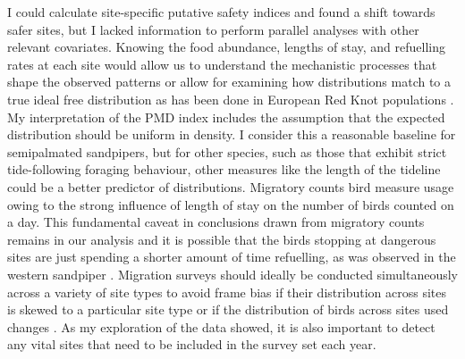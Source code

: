 I could calculate site-specific putative safety indices and found a shift towards safer sites, but I lacked information to perform parallel analyses with other relevant covariates. Knowing the food abundance, lengths of stay, and refuelling rates at each site would allow us to understand the mechanistic processes that shape the observed patterns or allow for examining how distributions match to a true ideal free distribution as has been done in European Red Knot populations \citep{Gils2006}. My interpretation of the PMD index  includes the assumption that the expected distribution should be uniform in density. I consider this a reasonable baseline for semipalmated sandpipers, but for other species, such as those that exhibit strict tide-following foraging behaviour, other measures like the length of the tideline could be a better predictor of distributions. Migratory counts  bird measure usage owing to the strong influence of length of stay on the number of birds counted on a day. This fundamental caveat in conclusions drawn from migratory counts remains in our analysis and it is possible that the birds stopping at dangerous sites are just spending a shorter amount of time refuelling, as was observed in the western sandpiper \citep{ydenberg_western_2004}. Migration surveys should ideally be conducted simultaneously across a variety of site types to avoid frame bias if their distribution across sites is skewed to a particular site type or if the distribution of birds across sites used changes \citep{Crewe2015b}. As my exploration of the data showed, it is also important to detect any vital sites that need to be included in the survey set each year. 

